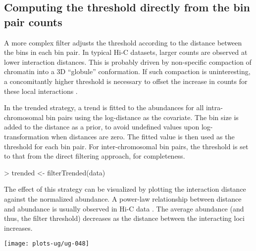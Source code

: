 \documentclass[12pt]{report}
\renewenvironment{Schunk}{\vspace{0pt}}{\vspace{0pt}}
\begin{document}
\subsection{Computing the threshold directly from the bin pair counts}
A more complex filter adjusts the threshold according to the distance between the bins in each bin pair. 
In typical Hi-C datasets, larger counts are observed at lower interaction distances.
This is probably driven by non-specific compaction of chromatin into a 3D ``globule'' conformation.
If such compaction is uninteresting, a concomitantly higher threshold is necessary to offset the increase in counts for these local interactions \citep{lin2012global}.

In the trended strategy, a trend is fitted to the abundances for all intra-chromosomal bin pairs using the log-distance as the covariate. 
The bin size is added to the distance as a prior, to avoid undefined values upon log-transformation when distances are zero.
The fitted value is then used as the threshold for each bin pair.
For inter-chromosomal bin pairs, the threshold is set to that from the direct filtering approach, for completeness.

\begin{Schunk}
\begin{Sinput}
> trended <- filterTrended(data)
\end{Sinput}
\end{Schunk}

The effect of this strategy can be visualized by plotting the interaction distance against the normalized abundance.
A power-law relationship between distance and abundance is usually observed in Hi-C data \citep{lieberman2009comprehensive}. 
The average abundance (and thus, the filter threshold) decreases as the distance between the interacting loci increases.

\begin{Schunk}
\end{Schunk}

\begin{center}
\texttt{[image: plots-ug/ug-048]}
\end{center}
\end{document}
